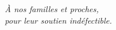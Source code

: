 \newpage
\thispagestyle{empty}
\vspace*{5cm}
\begin{flushright}
  \itshape
  À nos familles et proches,\\
  pour leur soutien indéfectible.
\end{flushright}
\newpage
